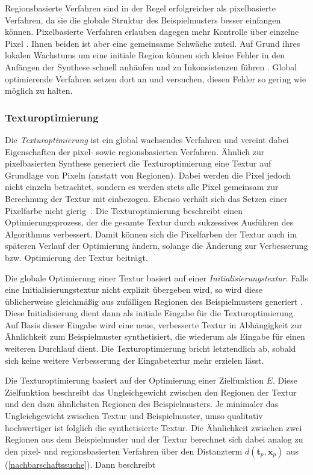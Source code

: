 Regionsbasierte Verfahren sind in der Regel erfolgreicher als pixelbasierte Verfahren, da sie die globale Struktur des Beispielmusters besser einfangen können.
Pixelbasierte Verfahren erlauben dagegen mehr Kontrolle über einzelne Pixel \cite{TextureOptimization}.
Ihnen beiden ist aber eine gemeinsame Schwäche zuteil.
Auf Grund ihres lokalen Wachstums um eine initiale Region können sich kleine Fehler in den Anfängen der Synthese schnell anhäufen und zu Inkonsistenzen führen \cite{TextureOptimization}.
Global optimierende Verfahren setzen dort an und versuchen, diesen Fehler so gering wie möglich zu halten.

\subsubsection{Texturoptimierung}
\label{chapter-texturoptimierung}

Die \emph{Texturoptimierung} ist ein global wachsendes Verfahren und vereint dabei Eigenschaften der pixel- sowie regionsbasierten Verfahren.
Ähnlich zur pixelbasierten Synthese generiert die Texturoptimierung eine Textur auf Grundlage von Pixeln (anstatt von Regionen).
Dabei werden die Pixel jedoch nicht einzeln betrachtet, sondern es werden stets alle Pixel gemeinsam zur Berechnung der Textur mit einbezogen.
Ebenso verhält sich das Setzen einer Pixelfarbe nicht \glqq gierig\grqq \ \cite{StateOfTheArt}.
Die Texturoptimierung beschreibt einen Optimierungsprozess, der die gesamte Textur durch sukzessives Ausführen des Algorithmus verbessert.
Damit können sich die Pixelfarben der Textur auch im späteren Verlauf der Optimierung ändern, solange die Änderung zur Verbesserung bzw. Optimierung der Textur beiträgt.

Die globale Optimierung einer Textur basiert auf einer \emph{Initialisierungstextur}.
Falls eine Initialisierungstextur nicht explizit übergeben wird, so wird diese üb\-lich\-er\-wei\-se gleichmäßig aus zufälligen Regionen des Beispielmusters generiert \cite{TextureOptimization}.
Diese Initialisierung dient dann als initiale Eingabe für die Texturoptimierung.
Auf Basis dieser Eingabe wird eine neue, verbesserte Textur in Abhängigkeit zur Ähnlichkeit zum Beispielmuster synthetisiert, die wiederum als Eingabe für einen weiteren Durchlauf dient.
Die Texturoptimierung bricht letztendlich ab, sobald sich keine weitere Verbesserung der Eingabetextur mehr erzielen lässt.

Die Texturoptimierung basiert auf der Optimierung einer Zielfunktion $E$.
Diese Zielfunktion beschreibt das Ungleichgewicht zwischen den Regionen der Textur und den dazu ähnlichsten Regionen des Beispielmusters.
Je minimaler das Ungleichgewicht zwischen Textur und Beispielmuster, umso qualitativ hochwertiger ist folglich die synthetisierte Textur.
Die Ähnlichkeit zwischen zwei Regionen aus dem Beispielmuster und der Textur berechnet sich dabei analog zu den pixel- und regionsbasierten Verfahren über den Distanzterm $d(\textbf{t}_p, \textbf{x}_p)$ aus (\ref{nachbarschaftssuche}).
Dann beschreibt

